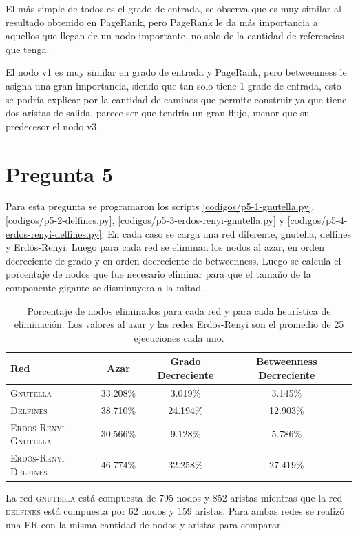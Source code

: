 \documentclass[letterpaper]{article}
\begin{document}
El más simple de todos es el grado de entrada, se observa que es muy similar al resultado obtenido en PageRank, pero PageRank le da más importancia a aquellos que llegan de un nodo importante, no solo de la cantidad de referencias que tenga.

El nodo v1 es muy similar en grado de entrada y PageRank, pero betweenness le asigna una gran importancia, siendo que tan solo tiene 1 grade de entrada, esto se podría explicar por la cantidad de caminos que permite construir ya que tiene dos aristas de salida, parece ser que tendría un gran flujo, menor que su predecesor el nodo v3.
\section{Pregunta 5}

Para esta pregunta se programaron los scripts \ref{codigos/p5-1-gnutella.py}, \ref{codigos/p5-2-delfines.py}, \ref{codigos/p5-3-erdos-renyi-gnutella.py} y \ref{codigos/p5-4-erdos-renyi-delfines.py}. En cada caso se carga una red diferente, gnutella, delfines y Erdös-Renyi. Luego para cada red se eliminan los nodos al azar, en orden decreciente de grado y en orden decreciente de betweenness. Luego se calcula el porcentaje de nodos que fue necesario eliminar para que el tamaño de la componente gigante se disminuyera a la mitad.

\begin{table}[H]
  \centering
  \renewcommand{\arraystretch}{1.1}
  \begin{tabular}{@{}lcccc@{}}
    \toprule
       Red & Azar & Grado Decreciente & Betweenness Decreciente\\
       \midrule
       \textsc{Gnutella} & 33.208\% &  3.019\% &  3.145\% \\
       \textsc{Delfines} & 38.710\% & 24.194\% & 12.903\% \\
       \textsc{Erdös-Renyi Gnutella} & 30.566\% & 9.128\% & 5.786\% \\
       \textsc{Erdös-Renyi Delfines} & 46.774\% & 32.258\% & 27.419\% \\

    \bottomrule
  \end{tabular}
  \caption{Porcentaje de nodos eliminados para cada red y para cada heurística de eliminación. Los valores al azar y las redes Erdös-Renyi son el promedio de 25 ejecuciones cada uno.}
  \label{table:2}
\end{table}

La red \textsc{gnutella} está compuesta de 795 nodos y 852 aristas mientras que la red \textsc{delfines} está compuesta por 62 nodos y 159 aristas. Para ambas redes se realizó una ER con la misma cantidad de nodos y aristas para comparar.
\end{document}
